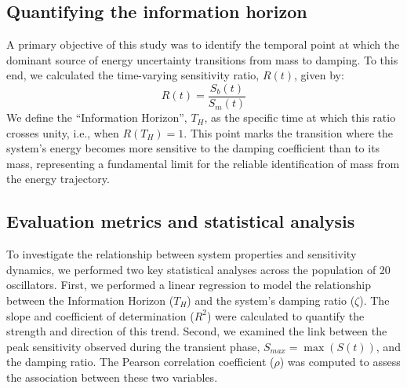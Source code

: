 \documentclass[]{article}
\begin{document}
\subsection{Quantifying the information horizon}
A primary objective of this study was to identify the temporal point at which the dominant source of energy uncertainty transitions from mass to damping. To this end, we calculated the time-varying sensitivity ratio, $R(t)$, given by:
\begin{equation}
R(t) = \frac{S_b(t)}{S_m(t)}
\label{eq:ratio}
\end{equation}
We define the ``Information Horizon'', $T_H$, as the specific time at which this ratio crosses unity, i.e., when $R(T_H) = 1$. This point marks the transition where the system's energy becomes more sensitive to the damping coefficient than to its mass, representing a fundamental limit for the reliable identification of mass from the energy trajectory.

\subsection{Evaluation metrics and statistical analysis}
To investigate the relationship between system properties and sensitivity dynamics, we performed two key statistical analyses across the population of 20 oscillators. First, we performed a linear regression to model the relationship between the Information Horizon ($T_H$) and the system's damping ratio ($\zeta$). The slope and coefficient of determination ($R^2$) were calculated to quantify the strength and direction of this trend. Second, we examined the link between the peak sensitivity observed during the transient phase, $S_{max} = \max(S(t))$, and the damping ratio. The Pearson correlation coefficient ($\rho$) was computed to assess the association between these two variables.
\end{document}
